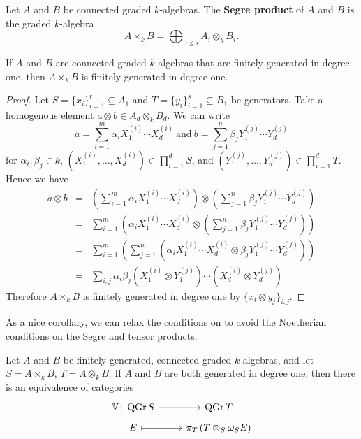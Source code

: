\begin{definition}\label{def: segre product}
  Let \(A\) and \(B\) be connected graded \(k\)-algebras.
  The \textbf{Segre product} of \(A\) and \(B\) is the graded \(k\)-algebra
  \[ A \times_k B = \bigoplus_{0 \leq i} A_i \otimes_k B_i.\]
\end{definition}

\begin{proposition}\label{proposition: segre product of generated in degree 1 is generated in degree 1}
  If \(A\) and \(B\) are connected graded \(k\)-algebras that are finitely generated in degree one, then \(A \times_k B\) is finitely generated in degree one.
\end{proposition}

\begin{proof}
  Let \(S = \{x_i\}_{i = 1}^r \subseteq A_1\) and \(T = \{y_i\}_{i = 1}^s \subseteq B_1\) be generators.
  Take a homogenous element \(a \otimes b \in A_d \otimes_k B_d\).
  We can write
  \[a = \sum_{i = 1}^m \alpha_i X_1^{(i)} \cdots X_d^{(i)}\ \text{and}\ b = \sum_{j = 1}^n \beta_j Y_1^{(j)} \cdots Y_d^{(j)}\]
  for \(\alpha_i,\beta_j \in k\), \((X_1^{(i)}, \ldots, X_d^{(i)}) \in \prod_{i = 1}^d S\), and \((Y_1^{(j)}, \ldots, Y_d^{(j)}) \in \prod_{i = 1}^d T\).
  Hence we have
  \begin{eqnarray*}
    a \otimes b &=& \left(\sum_{i=1}^m \alpha_i X_1^{(i)} \cdots X_d^{(i)}\right) \otimes \left(\sum_{j = 1}^n \beta_j Y_1^{(j)} \cdots Y_d^{(j)}\right)\\
    &=& \sum_{i = 1}^m\left(\alpha_i X_1^{(i)} \cdots X_d^{(i)} \otimes \left(\sum_{j = 1}^n \beta_j Y_1^{(j)} \cdots Y_d^{(j)}\right)\right)\\
    &=& \sum_{i = 1}^m\left(\sum_{j = 1}^n\left(\alpha_i  X_1^{(i)} \cdots X_d^{(i)} \otimes \beta_j Y_1^{(j)} \cdots Y_d^{(j)}\right)\right)\\
    &=& \sum_{i,j} \alpha_i\beta_j (X_1^{(i)} \otimes Y_1^{(j)}) \cdots (X_d^{(i)} \otimes Y_d^{(j)})
  \end{eqnarray*}
    Therefore \(A \times_k B\) is finitely generated in degree one by \(\{x_i \otimes y_j\}_{i,j}\).
\end{proof}

As a nice corollary, we can relax the conditions on \cite[Theorem 2.4]{VR96} to avoid the Noetherian conditions on the Segre and tensor products.

\begin{theorem}[{\cite[Theorem 2.4]{VR96}}]\label{theorem: Van Rompay}
    Let \(A\) and \(B\) be finitely generated, connected graded \(k\)-algebras, and let \(S = A \times_k B\), \(T = A \otimes_k B\).
    If \(A\) and \(B\) are both generated in degree one, then there is an equivalence of categories
    \[\begin{tikzcd}[row sep=tiny]
    \mathbb{V} \colon \QGr{S} \arrow{r} & \QGr{T}\\
    E \arrow[mapsto]{r} & \pi_{T}\left(T \otimes_S \omega_{S}E\right)
    \end{tikzcd}\]
\end{theorem}

